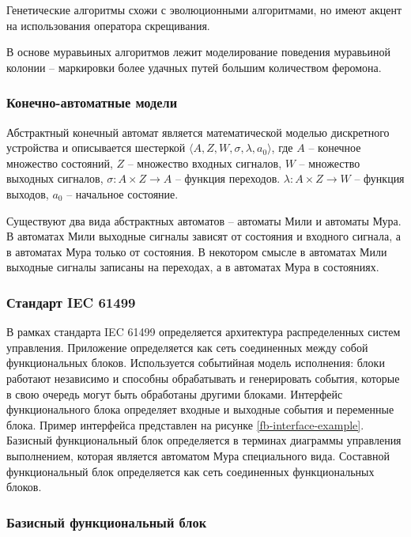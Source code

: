 \documentclass[14pt]{extarticle}
\theoremstyle{plain}
\theoremstyle{definition}
\begin{document}
Генетические алгоритмы схожи с эволюционными алгоритмами, но имеют акцент на
использования оператора скрещивания.

В основе муравьиных алгоритмов лежит моделирование поведения муравьиной колонии
-- маркировки более удачных путей большим количеством феромона.

\subsubsection{Конечно-автоматные модели}

Абстрактный конечный автомат является математической моделью дискретного устройства
и описывается шестеркой $\langle A, Z, W, \sigma, \lambda, a_0 \rangle$,
где $A$ -- конечное множество состояний, $Z$ -- множество входных сигналов,
$W$ -- множество выходных сигналов, $\sigma : A \times Z \rightarrow A$ --
функция переходов. $\lambda : A \times Z \rightarrow W$ -- функция выходов,
$a_0$  -- начальное состояние.

Существуют два вида абстрактных автоматов -- автоматы Мили и автоматы Мура.
В автоматах Мили выходные сигналы зависят от состояния и входного сигнала,
а в автоматах Мура только от состояния. В некотором смысле в автоматах Мили
выходные сигналы записаны на переходах, а в автоматах Мура в состояниях.

\subsubsection{Стандарт IEC 61499}

В рамках стандарта IEC 61499 определяется архитектура распределенных систем управления.
Приложение определяется как сеть соединенных между собой функциональных блоков.
Используется событийная модель исполнения: блоки работают независимо и способны
обрабатывать и генерировать события, которые в свою очередь могут быть обработаны
другими блоками. Интерфейс функционального блока определяет входные и выходные события и переменные блока.
Пример интерфейса представлен на рисунке \ref{fb-interface-example}.
Базисный функциональный блок определяется в терминах диаграммы управления выполнением, которая является
автоматом Мура специального вида.
Составной функциональный блок определяется как сеть соединенных функциональных блоков.

\subsubsection{Базисный функциональный блок}
\end{document}
